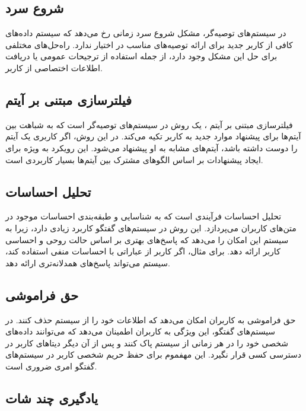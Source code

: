 \subsection{شروع سرد}

در سیستم‌های توصیه‌گر، مشکل 
شروع سرد%
 زمانی رخ می‌دهد که سیستم داده‌های کافی از کاربر جدید برای ارائه توصیه‌های مناسب در اختیار ندارد. راه‌حل‌های مختلفی برای حل این مشکل وجود دارد، از جمله استفاده از ترجیحات عمومی یا دریافت اطلاعات اختصاصی از کاربر.

\subsection{فیلترسازی مبتنی بر آیتم} 
فیلترسازی مبتنی بر آیتم%
، یک روش در سیستم‌های توصیه‌گر است که به شباهت بین آیتم‌ها برای پیشنهاد موارد جدید به کاربر تکیه می‌کند. در این روش، اگر کاربری یک آیتم را دوست داشته باشد، آیتم‌های مشابه به او پیشنهاد می‌شود. این رویکرد به ویژه برای ایجاد پیشنهادات بر اساس الگوهای مشترک بین آیتم‌ها بسیار کاربردی است.

\subsection{تحلیل احساسات}
تحلیل احساسات%
 فرآیندی است که به شناسایی و طبقه‌بندی احساسات موجود در متن‌های کاربران می‌پردازد. این روش در سیستم‌های گفتگو کاربرد زیادی دارد، زیرا به سیستم این امکان را می‌دهد که پاسخ‌های بهتری بر اساس حالت روحی و احساسی کاربر ارائه دهد. برای مثال، اگر کاربر از عباراتی با احساسات منفی استفاده کند، سیستم می‌تواند پاسخ‌های همدلانه‌تری ارائه دهد.


\subsection{حق فراموشی}

حق فراموشی%
به کاربران امکان می‌دهد که اطلاعات خود را از سیستم حذف کنند. در سیستم‌های گفتگو، این ویژگی به کاربران اطمینان می‌دهد که می‌توانند داده‌های شخصی خود را در هر زمانی از سیستم پاک کنند و پس از آن دیگر دیتاهای کاربر در دسترسی کسی قرار نگیرد.%
\cite{zhang2024right}
 این مهفموم برای حفظ حریم شخصی کاربر در سیستم‌های گفتگو امری ضروری است.

\subsection{یادگیری چند شات}

